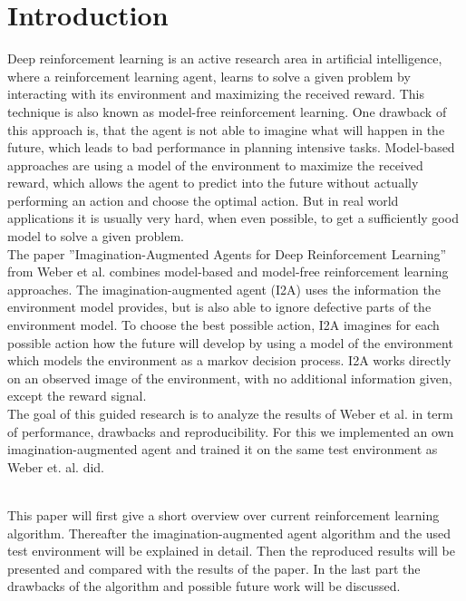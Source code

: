 \section{Introduction}

Deep reinforcement learning is an active research area in artificial intelligence, where a reinforcement learning agent, learns to solve a given problem by interacting with its environment and maximizing the received reward.
This technique is also known as model-free reinforcement learning. 
One drawback of this approach is, that the agent is not able to imagine what will happen in the future, which leads to bad performance in planning intensive tasks.
Model-based approaches are using a model of the environment to maximize the received reward, which allows the agent to predict into the future without actually performing an action and choose the optimal action.
But in real world applications it is usually very hard, when even possible, to get a sufficiently good model to solve a given problem.\\

The paper ”Imagination-Augmented Agents for Deep Reinforcement Learning” from Weber et al. \cite{I2A} combines model-based and model-free reinforcement learning approaches.
The imagination-augmented agent (I2A) uses the information the environment model provides, but is also able to ignore defective parts of the environment model. 
To choose the best possible action, I2A imagines for each possible action how the future will develop by using a model of the environment which models the environment as a markov decision process. 
I2A works directly on an observed image of the environment, with no additional information given, except the reward signal.\\

The goal of this guided research is to analyze the results of Weber et al. \cite{I2A} in term of performance, drawbacks and reproducibility.
For this we implemented an own imagination-augmented agent and trained it on the same test environment as Weber et. al. did.\\\

This paper will first give a short overview over current reinforcement learning algorithm. 
Thereafter the imagination-augmented agent algorithm and the used test environment will be explained in detail. Then the reproduced results will be presented and compared with the results of the paper. In the last part the drawbacks of the algorithm and possible future work will be discussed.


